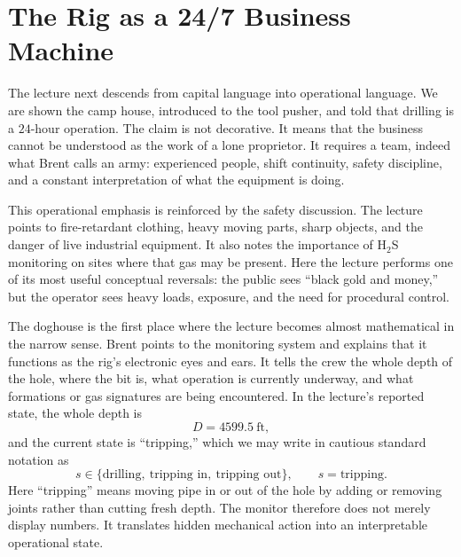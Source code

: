 \section{The Rig as a 24/7 Business Machine}

The lecture next descends from capital language into operational language. We are shown the camp house, introduced to the tool pusher, and told that drilling is a \(24\)-hour operation. The claim is not decorative. It means that the business cannot be understood as the work of a lone proprietor. It requires a team, indeed what Brent calls an army: experienced people, shift continuity, safety discipline, and a constant interpretation of what the equipment is doing.

This operational emphasis is reinforced by the safety discussion. The lecture points to fire-retardant clothing, heavy moving parts, sharp objects, and the danger of live industrial equipment. It also notes the importance of H\(_2\)S monitoring on sites where that gas may be present. Here the lecture performs one of its most useful conceptual reversals: the public sees ``black gold and money,'' but the operator sees heavy loads, exposure, and the need for procedural control.

The doghouse is the first place where the lecture becomes almost mathematical in the narrow sense. Brent points to the monitoring system and explains that it functions as the rig's electronic eyes and ears. It tells the crew the whole depth of the hole, where the bit is, what operation is currently underway, and what formations or gas signatures are being encountered. In the lecture's reported state, the whole depth is
\begin{equation}
D = 4599.5\ \mathrm{ft},
\end{equation}
and the current state is ``tripping,'' which we may write in cautious standard notation as
\begin{equation}
s \in \{\text{drilling},\ \text{tripping in},\ \text{tripping out}\}, \qquad s=\text{tripping}.
\end{equation}
Here ``tripping'' means moving pipe in or out of the hole by adding or removing joints rather than cutting fresh depth. The monitor therefore does not merely display numbers. It translates hidden mechanical action into an interpretable operational state.


